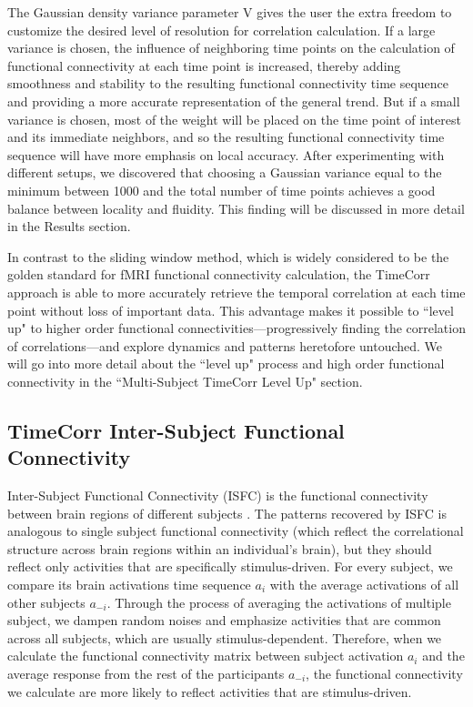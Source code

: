 \documentclass[11pt]{article}
\begin{document}
The Gaussian density variance parameter V gives the user the extra freedom to customize the desired level of resolution for correlation calculation. If a large variance is chosen, the influence of neighboring time points on the calculation of functional connectivity at each time point is increased, thereby adding smoothness and stability to the resulting functional connectivity time sequence and providing a more accurate representation of the general trend. But if a small variance is chosen, most of the weight will be placed on the time point of interest and its immediate neighbors, and so the resulting functional connectivity time sequence will have more emphasis on local accuracy. After experimenting with different setups, we discovered that choosing a Gaussian variance equal to the minimum between 1000 and the total number of time points achieves a good balance between locality and fluidity. This finding will be discussed in more detail in the Results section.

In contrast to the sliding window method, which is widely considered to be the golden standard for fMRI functional connectivity calculation, the TimeCorr approach is able to more accurately retrieve the temporal correlation at each time point without loss of important data. This advantage makes it possible to ``level up" to higher order functional connectivities---progressively finding the correlation of correlations---and explore dynamics and patterns heretofore untouched. We will go into more detail about the ``level up" process and high order functional connectivity in the ``Multi-Subject TimeCorr Level Up" section.

\subsection{TimeCorr Inter-Subject Functional Connectivity}

Inter-Subject Functional Connectivity (ISFC) is the functional connectivity between brain regions of different subjects \cite{jeremy2017}\cite{hasson2016}. The patterns recovered by ISFC is analogous to single subject functional connectivity (which reflect the correlational structure across brain regions within an individual's
brain), but they should reflect only activities that are specifically stimulus-driven. For every subject, we compare its brain activations time sequence $a_i$ with the average activations of all other subjects $a_{-i}$. Through the process of averaging the activations of multiple subject, we dampen random noises and emphasize activities that are common across all subjects, which are usually stimulus-dependent. Therefore, when we calculate the functional connectivity matrix between subject activation $a_i$ and the average response from the rest of the participants $a_{-i}$, the functional connectivity we calculate are more likely to reflect activities that are stimulus-driven.
\end{document}
